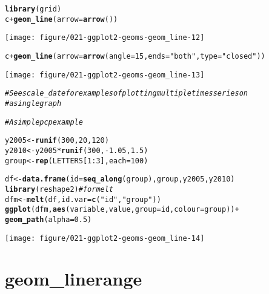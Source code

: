 \documentclass[a4paper,titlepage]{tufte-handout}\usepackage[]{graphicx}\usepackage[]{color}
\makeatletter
\def\maxwidth{ %
  \ifdim\Gin@nat@width>\linewidth
    \linewidth
  \else
    \Gin@nat@width
  \fi
}
\newcommand{\hlnum}[1]{\textcolor[rgb]{0.686,0.059,0.569}{#1}}%
\newcommand{\hlstr}[1]{\textcolor[rgb]{0.192,0.494,0.8}{#1}}%
\newcommand{\hlcom}[1]{\textcolor[rgb]{0.678,0.584,0.686}{\textit{#1}}}%
\newcommand{\hlopt}[1]{\textcolor[rgb]{0,0,0}{#1}}%
\newcommand{\hlstd}[1]{\textcolor[rgb]{0.345,0.345,0.345}{#1}}%
\newcommand{\hlkwb}[1]{\textcolor[rgb]{0.69,0.353,0.396}{#1}}%
\newcommand{\hlkwc}[1]{\textcolor[rgb]{0.333,0.667,0.333}{#1}}%
\newcommand{\hlkwd}[1]{\textcolor[rgb]{0.737,0.353,0.396}{\textbf{#1}}}%
\newenvironment{kframe}{%
 \def\at@end@of@kframe{}%
 \ifinner\ifhmode%
  \def\at@end@of@kframe{\end{minipage}}%
  \begin{minipage}{\columnwidth}%
 \fi\fi%
 \def\FrameCommand##1{\hskip\@totalleftmargin \hskip-\fboxsep
 \colorbox{shadecolor}{##1}\hskip-\fboxsep
     \hskip-\linewidth \hskip-\@totalleftmargin \hskip\columnwidth}%
 \MakeFramed {\advance\hsize-\width
   \@totalleftmargin\z@ \linewidth\hsize
   \@setminipage}}%
 {\par\unskip\endMakeFramed%
 \at@end@of@kframe}
\newenvironment{knitrout}{}{} %
\makeatother
\begin{document}
\begin{knitrout}
\begin{kframe}
\begin{alltt}
\hlkwd{library}\hlstd{(grid)}
\hlstd{c} \hlopt{+} \hlkwd{geom_line}\hlstd{(}\hlkwc{arrow} \hlstd{=} \hlkwd{arrow}\hlstd{())}
\end{alltt}
\end{kframe}
\texttt{[image: figure/021-ggplot2-geoms-geom\_line-12]} 
\begin{kframe}\begin{alltt}
\hlstd{c} \hlopt{+} \hlkwd{geom_line}\hlstd{(}\hlkwc{arrow} \hlstd{=} \hlkwd{arrow}\hlstd{(}\hlkwc{angle} \hlstd{=} \hlnum{15}\hlstd{,} \hlkwc{ends} \hlstd{=} \hlstr{"both"}\hlstd{,} \hlkwc{type} \hlstd{=} \hlstr{"closed"}\hlstd{))}
\end{alltt}
\end{kframe}
\texttt{[image: figure/021-ggplot2-geoms-geom\_line-13]} 
\begin{kframe}\begin{alltt}
\hlcom{# See scale_date for examples of plotting multiple times series on}
\hlcom{# a single graph}

\hlcom{# A simple pcp example}

\hlstd{y2005} \hlkwb{<-} \hlkwd{runif}\hlstd{(}\hlnum{300}\hlstd{,} \hlnum{20}\hlstd{,} \hlnum{120}\hlstd{)}
\hlstd{y2010} \hlkwb{<-} \hlstd{y2005} \hlopt{*} \hlkwd{runif}\hlstd{(}\hlnum{300}\hlstd{,} \hlopt{-}\hlnum{1.05}\hlstd{,} \hlnum{1.5}\hlstd{)}
\hlstd{group} \hlkwb{<-} \hlkwd{rep}\hlstd{(LETTERS[}\hlnum{1}\hlopt{:}\hlnum{3}\hlstd{],} \hlkwc{each} \hlstd{=} \hlnum{100}\hlstd{)}

\hlstd{df} \hlkwb{<-} \hlkwd{data.frame}\hlstd{(}\hlkwc{id} \hlstd{=} \hlkwd{seq_along}\hlstd{(group), group, y2005, y2010)}
\hlkwd{library}\hlstd{(reshape2)} \hlcom{# for melt}
\hlstd{dfm} \hlkwb{<-} \hlkwd{melt}\hlstd{(df,} \hlkwc{id.var} \hlstd{=} \hlkwd{c}\hlstd{(}\hlstr{"id"}\hlstd{,} \hlstr{"group"}\hlstd{))}
\hlkwd{ggplot}\hlstd{(dfm,} \hlkwd{aes}\hlstd{(variable, value,} \hlkwc{group} \hlstd{= id,} \hlkwc{colour} \hlstd{= group))} \hlopt{+}
  \hlkwd{geom_path}\hlstd{(}\hlkwc{alpha} \hlstd{=} \hlnum{0.5}\hlstd{)}
\end{alltt}
\end{kframe}
\texttt{[image: figure/021-ggplot2-geoms-geom\_line-14]} 

\end{knitrout}


\section{geom\_linerange}
\end{document}
